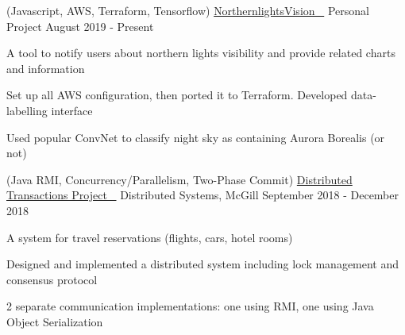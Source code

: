 


\begin{cventries}


\cventry
{(Javascript, AWS, Terraform, Tensorflow)} %
{\href{https://github.com/stumash/northern-lights-vision}{NorthernlightsVision \ \faGithubSquare\acvHeaderIconSep}} %
{Personal Project} %
{August 2019 - Present} %
{ %
\begin{cvitems}
\item {A tool to notify users about northern lights visibility and provide related charts and information}
\item {Set up all AWS configuration, then ported it to Terraform. Developed data-labelling interface}
\item {Used popular ConvNet to classify night sky as containing Aurora Borealis (or not)}
\end{cvitems}
}


\cventry
{(Java RMI, Concurrency/Parallelism, Two-Phase Commit)} %
{\href{https://github.com/stumash/DistributedSystemsProject}{Distributed Transactions Project \ \faGithubSquare\acvHeaderIconSep}} %
{Distributed Systems, McGill} %
{September 2018 - December 2018} %
{ %
\begin{cvitems}
\item {A system for travel reservations (flights, cars, hotel rooms)}
\item {Designed and implemented a distributed system including lock management and consensus protocol}
\item {2 separate communication implementations: one using RMI, one using Java Object Serialization}
\end{cvitems}
}


\end{cventries}

